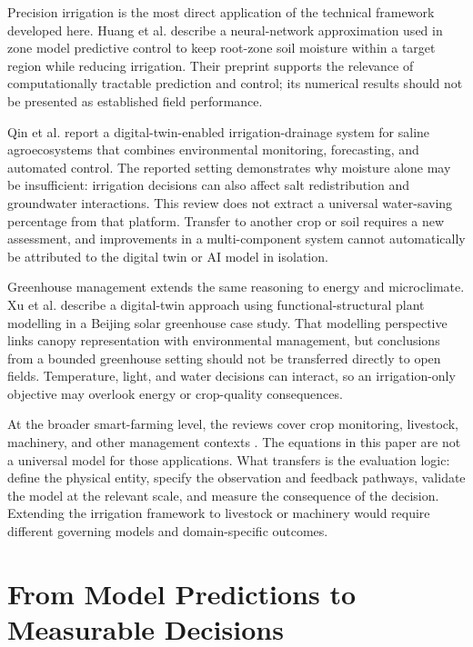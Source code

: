 \documentclass[11pt,a4paper]{article}
\begin{document}
Precision irrigation is the most direct application of the technical framework developed here. Huang et al. \cite{R18} describe a neural-network approximation used in zone model predictive control to keep root-zone soil moisture within a target region while reducing irrigation. Their preprint supports the relevance of computationally tractable prediction and control; its numerical results should not be presented as established field performance.

Qin et al. \cite{R19} report a digital-twin-enabled irrigation-drainage system for saline agroecosystems that combines environmental monitoring, forecasting, and automated control. The reported setting demonstrates why moisture alone may be insufficient: irrigation decisions can also affect salt redistribution and groundwater interactions. This review does not extract a universal water-saving percentage from that platform. Transfer to another crop or soil requires a new assessment, and improvements in a multi-component system cannot automatically be attributed to the digital twin or AI model in isolation.

Greenhouse management extends the same reasoning to energy and microclimate. Xu et al. \cite{R20} describe a digital-twin approach using functional-structural plant modelling in a Beijing solar greenhouse case study. That modelling perspective links canopy representation with environmental management, but conclusions from a bounded greenhouse setting should not be transferred directly to open fields. Temperature, light, and water decisions can interact, so an irrigation-only objective may overlook energy or crop-quality consequences.

At the broader smart-farming level, the reviews cover crop monitoring, livestock, machinery, and other management contexts \cite{R02,R03}. The equations in this paper are not a universal model for those applications. What transfers is the evaluation logic: define the physical entity, specify the observation and feedback pathways, validate the model at the relevant scale, and measure the consequence of the decision. Extending the irrigation framework to livestock or machinery would require different governing models and domain-specific outcomes.

\section{From Model Predictions to Measurable Decisions}

\label{sec:8}
\end{document}
